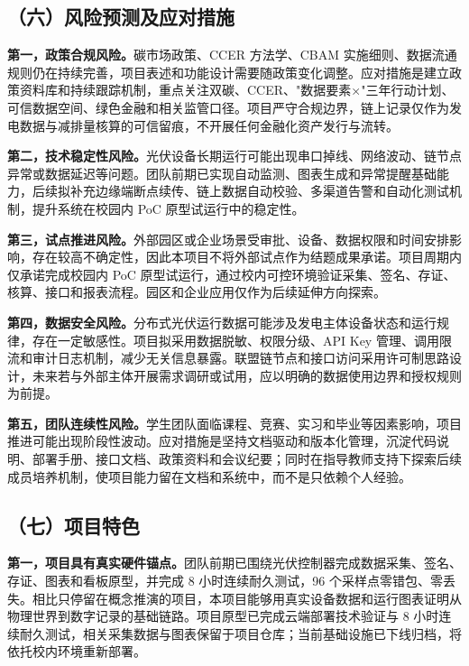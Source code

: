 \documentclass[12pt,a4paper]{article}
\begin{document}
\subsection*{（六）风险预测及应对措施}

\textbf{第一，政策合规风险。}碳市场政策、CCER 方法学、CBAM 实施细则、数据流通规则仍在持续完善，项目表述和功能设计需要随政策变化调整。应对措施是建立政策资料库和持续跟踪机制，重点关注双碳、CCER、"数据要素×"三年行动计划、可信数据空间、绿色金融和相关监管口径。项目严守合规边界，链上记录仅作为发电数据与减排量核算的可信留痕，不开展任何金融化资产发行与流转。

\textbf{第二，技术稳定性风险。}光伏设备长期运行可能出现串口掉线、网络波动、链节点异常或数据延迟等问题。团队前期已实现自动监测、图表生成和异常提醒基础能力，后续拟补充边缘端断点续传、链上数据自动校验、多渠道告警和自动化测试机制，提升系统在校园内 PoC 原型试运行中的稳定性。

\textbf{第三，试点推进风险。}外部园区或企业场景受审批、设备、数据权限和时间安排影响，存在较高不确定性，因此本项目不将外部试点作为结题成果承诺。项目周期内仅承诺完成校园内 PoC 原型试运行，通过校内可控环境验证采集、签名、存证、核算、接口和报表流程。园区和企业应用仅作为后续延伸方向探索。

\textbf{第四，数据安全风险。}分布式光伏运行数据可能涉及发电主体设备状态和运行规律，存在一定敏感性。项目拟采用数据脱敏、权限分级、API Key 管理、调用限流和审计日志机制，减少无关信息暴露。联盟链节点和接口访问采用许可制思路设计，未来若与外部主体开展需求调研或试用，应以明确的数据使用边界和授权规则为前提。

\textbf{第五，团队连续性风险。}学生团队面临课程、竞赛、实习和毕业等因素影响，项目推进可能出现阶段性波动。应对措施是坚持文档驱动和版本化管理，沉淀代码说明、部署手册、接口文档、政策资料和会议纪要；同时在指导教师支持下探索后续成员培养机制，使项目能力留在文档和系统中，而不是只依赖个人经验。


\subsection*{（七）项目特色}

\textbf{第一，项目具有真实硬件锚点。}团队前期已围绕光伏控制器完成数据采集、签名、存证、图表和看板原型，并完成 8 小时连续耐久测试，96 个采样点零错包、零丢失。相比只停留在概念推演的项目，本项目能够用真实设备数据和运行图表证明从物理世界到数字记录的基础链路。项目原型已完成云端部署技术验证与 8 小时连续耐久测试，相关采集数据与图表保留于项目仓库；当前基础设施已下线归档，将依托校内环境重新部署。
\end{document}
